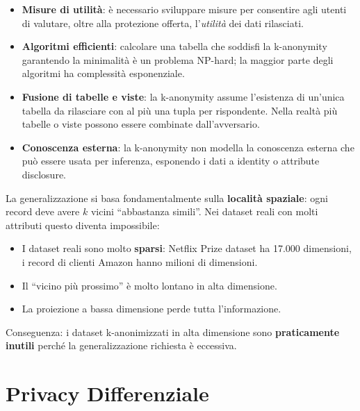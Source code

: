 \documentclass[a4paper,11pt]{article}
\begin{document}
\begin{nota}
\begin{itemize}
  \item \textbf{Misure di utilit\`{a}}: \`{e} necessario sviluppare misure per consentire agli utenti di valutare, oltre alla protezione offerta, l'\emph{utilit\`{a}} dei dati rilasciati.
  \item \textbf{Algoritmi efficienti}: calcolare una tabella che soddisfi la k-anonymity garantendo la minimalit\`{a} \`{e} un problema NP-hard; la maggior parte degli algoritmi ha complessit\`{a} esponenziale.
  \item \textbf{Fusione di tabelle e viste}: la k-anonymity assume l'esistenza di un'unica tabella da rilasciare con al pi\`{u} una tupla per rispondente. Nella realt\`{a} pi\`{u} tabelle o viste possono essere combinate dall'avversario.
  \item \textbf{Conoscenza esterna}: la k-anonymity non modella la conoscenza esterna che pu\`{o} essere usata per inferenza, esponendo i dati a identity o attribute disclosure.
\end{itemize}
\end{nota}

\begin{nota}
La generalizzazione si basa fondamentalmente sulla \textbf{localit\`{a} spaziale}: ogni record deve avere $k$ vicini ``abbastanza simili''. Nei dataset reali con molti attributi questo diventa impossibile:
\begin{itemize}
  \item I dataset reali sono molto \textbf{sparsi}: Netflix Prize dataset ha 17.000 dimensioni, i record di clienti Amazon hanno milioni di dimensioni.
  \item Il ``vicino pi\`{u} prossimo'' \`{e} molto lontano in alta dimensione.
  \item La proiezione a bassa dimensione perde tutta l'informazione.
\end{itemize}
Conseguenza: i dataset k-anonimizzati in alta dimensione sono \textbf{praticamente inutili} perch\'{e} la generalizzazione richiesta \`{e} eccessiva.
\end{nota}

\section{Privacy Differenziale}
\end{document}
